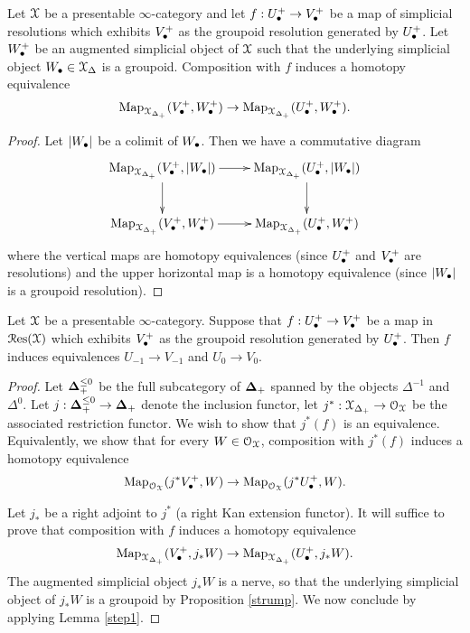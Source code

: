 \begin{lemma}\label{step1}
Let $\operatorname{\mathcal{X}}$ be a presentable $\infty$-category and let $f: U_{\bullet}^{+} \rightarrow V_{\bullet}^{+}$ be a map of simplicial resolutions which exhibits $V_{\bullet}^{+}$ as the groupoid resolution generated by $U_{\bullet}^{+}$. Let $W_{\bullet}^{+}$ be an augmented simplicial object of $\operatorname{\mathcal{X}}$ such that the underlying simplicial object $W_{\bullet} \in \operatorname{\mathcal{X}}_{\Delta}$
is a groupoid. Composition with $f$ induces a homotopy equivalence
$$ \operatorname{{Map}}_{\operatorname{\mathcal{X}}_{\Delta_{+}}}( V_{\bullet}^{+}, W_{\bullet}^{+} )
\rightarrow \operatorname{{Map}}_{\operatorname{\mathcal{X}}_{\Delta_{+}}}( U_{\bullet}^{+}, W_{\bullet}^{+} ).$$
\end{lemma}

\begin{proof}
Let $|W_{\bullet}|$ be a colimit of $W_{\bullet}$. Then we have a commutative diagram
$$ \xymatrix{ \bHom_{\calX_{\Delta_{+}}}( V_{\bigdot}^{+}, |W_{\bigdot}| )
\ar[r] \ar[d] &  \bHom_{\calX_{\Delta_{+}}}( U_{\bigdot}^{+}, |W_{\bigdot}| ) \ar[d] \\
\bHom_{\calX_{\Delta_{+}}}( V_{\bigdot}^{+}, W_{\bigdot}^{+} )
\ar[r] & \bHom_{\calX_{\Delta_{+}}}( U_{\bigdot}^{+}, W_{\bigdot}^{+} )} $$
where the vertical maps are homotopy equivalences (since $U_{\bullet}^{+}$ and $V_{\bullet}^{+}$ are resolutions) and the upper horizontal map is a homotopy equivalence (since $|W_{\bullet}|$ is a groupoid resolution).
\end{proof}

\begin{lemma}\label{step9}
Let $\operatorname{\mathcal{X}}$ be a presentable $\infty$-category. Suppose that $f: U_{\bullet}^{+} \rightarrow V_{\bullet}^{+}$ be a map in $\operatorname{\mathcal{R}es}(\operatorname{\mathcal{X}})$ which exhibits $V_{\bullet}^{+}$ as the groupoid resolution generated by $U_{\bullet}^{+}$. Then $f$ induces equivalences $U_{-1} \rightarrow V_{-1}$ and
$U_{0} \rightarrow V_{0}$.
\end{lemma}

\begin{proof}
Let $\operatorname{{\bf \Delta}}^{ \leq 0}_{+}$ be the full subcategory of $\operatorname{{\bf \Delta}}_{+}$ spanned by the objects $\Delta^{-1}$ and $\Delta^0$. Let $j: \operatorname{{\bf \Delta}}^{\leq 0}_{+} \rightarrow \operatorname{{\bf \Delta}}_{+}$ denote the inclusion functor, let
$j^{\ast}: \operatorname{\mathcal{X}}_{\Delta_{+}} \rightarrow \operatorname{\mathcal{O}}_{\operatorname{\mathcal{X}}}$ be the associated restriction functor. We wish to show that $j^{\ast}(f)$ is an equivalence. Equivalently, we show that for every $W \in \operatorname{\mathcal{O}}_{\operatorname{\mathcal{X}}}$, 
composition with $j^{\ast}(f)$ induces a homotopy equivalence
$$ \operatorname{{Map}}_{\operatorname{\mathcal{O}}_{\operatorname{\mathcal{X}}}}( j^{\ast} V_{\bullet}^{+}, W )
\rightarrow \operatorname{{Map}}_{\operatorname{\mathcal{O}}_{\operatorname{\mathcal{X}}}}( j^{\ast} U_{\bullet}^{+}, W ).$$

Let $j_{\ast}$ be a right adjoint to $j^{\ast}$ (a right Kan extension functor). It will suffice to prove that composition with $f$ induces a homotopy equivalence
$$ \operatorname{{Map}}_{\operatorname{\mathcal{X}}_{\Delta_{+}}}( V_{\bullet}^{+}, j_{\ast} W )
\rightarrow \operatorname{{Map}}_{\operatorname{\mathcal{X}}_{\Delta_{+}}}( U_{\bullet}^{+}, j_{\ast} W ).$$
The augmented simplicial object $j_{\ast} W$ is a \Cech nerve, so that the underlying simplicial object of $j_{\ast} W$ is a groupoid by Proposition \ref{strump}. We now conclude by applying Lemma \ref{step1}.
\end{proof}

